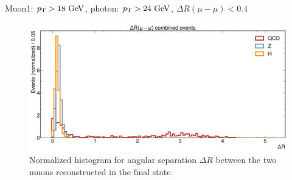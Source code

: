 \documentclass[aspectratio = 1610, xcolor = dvipsnames]{beamer}
\newcommand{\GeV}{\textrm{ }\mathrm{GeV}}
\newcommand{\pt}{p_{\rm T}}
\begin{document}

    \begin{frame}[t]{Muon1: $\pt > 18\GeV$, photon: $\pt>24\GeV$, $\Delta R(\mu-\mu)<0.4$}
        
        \begin{figure}[c]
            \centering
            \includegraphics[width=.8\textwidth]{images/dR_mumu_combined.pdf}
            \caption{Normalized histogram for angular separation $\Delta R$ between the two muons reconstructed in the final state. \label{im:dR_mumu_combined}}
        \end{figure}

    \end{frame}
    
    
\end{document}
